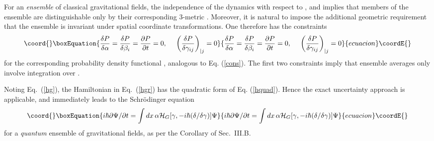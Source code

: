 \documentclass[a4paper,preprint, showpacs, aps, draft]{revtex4}
\begin{document}
{{For an {\it ensemble} of classical gravitational fields, the 
independence of the dynamics with respect to \myHighlight{$\alpha$}\coordHE{}, \myHighlight{${\bm \beta}$}\coordHE{} and 
\coordHE{} implies that members of the ensemble are distinguishable only by their
corresponding 3-metric \myHighlight{$\gamma$}\coordHE{}.  Moreover, it 
is natural to impose the additional geometric requirement that the ensemble is
invariant under spatial coordinate transformations.  One therefore has
the constraints
\begin{equation}\coord{}\boxEquation{ \label{conp}
\frac{\delta P}{\delta\alpha}= \frac{\delta P}{\delta\beta_i} =
\frac{\partial P}{\partial t} = 0,~~~~
\left(\frac{\delta P}{\delta\gamma_{ij}}\right)_{| j}=0 
}{ \frac{\delta P}{\delta\alpha}= \frac{\delta P}{\delta\beta_i} =
\frac{\partial P}{\partial t} = 0,~~~~
\left(\frac{\delta P}{\delta\gamma_{ij}}\right)_{| j}=0 
}{ecuacion}\coordE{}\end{equation}
for the corresponding probability density functional \coordHE{},
analogous to Eq. (\ref{cons}). The first two constraints imply that
ensemble averages only involve integration over \myHighlight{$\gamma$}\coordHE{}.
 
Noting Eq.~(\ref{hg}), the Hamiltonian \coordHE{} in Eq.~(\ref{hgr}) 
has the quadratic form of Eq. (\ref{hquad}). Hence 
the exact uncertainty approach is applicable, and immediately leads to the
Schr\"{o}dinger equation 
\begin{equation}\coord{}\boxEquation{ \label{seq}
i\hbar\partial\Psi/\partial t=\int dx\,\alpha {\cal H}_G[\gamma,
-i\hbar(\delta/\delta\gamma)]\Psi 
}{ i\hbar\partial\Psi/\partial t=\int dx\,\alpha {\cal H}_G[\gamma,
-i\hbar(\delta/\delta\gamma)]\Psi 
}{ecuacion}\coordE{}\end{equation}
for a {\it quantum} ensemble of gravitational fields, as per the
Corollary of Sec.~III.B.  

}}
\end{document}
